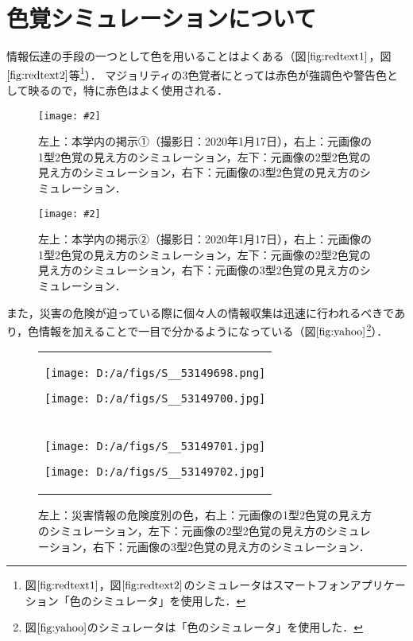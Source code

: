 \documentclass[uplatex,paper=a4,fontsize=4.0truemm,jafontsize=4.0truemm,head_space=30.0truemm,foot_space=30.0truemm,baselineskip=8.0truemm,line_length=40zw,gutter=25.0truemm,oneside,openany,fleqn,hanging_panctuation,open_bracket_pos=nibu_tentsuki,dvipdfmx,jis2004,book,titlepage]{jlreq}
\theoremstyle{mystyle}
\newcommand{\captiondot}[1]{\caption{#1．}}
\newcommand{\figureinput}[4]{\begin{figure}[tbp]\centering\texttt{[image: \#2]}\captiondot{#3}\label{fig:#4}\end{figure}}
\newcommand{\mathdisplaystyle}[1]{\(\displaystyle{#1}\)}
\newcommand{\Reference}[1]{\mathdisplaystyle{\ref{#1}}}
\begin{document}
		\section{色覚シミュレーションについて}
			情報伝達の手段の一つとして色を用いることはよくある（図\Reference{fig:redtext1}，図\Reference{fig:redtext2}等\footnote{図\Reference{fig:redtext1}，図\Reference{fig:redtext2}のシミュレータはスマートフォンアプリケーション「色のシミュレータ」を使用した．}）．
			マジョリティの3色覚者にとっては赤色が強調色や警告色として映るので，特に赤色はよく使用される．
			\figureinput{width=7.5truecm}{D:/a/figs/S__50315266.jpg}{左上：本学内の掲示①（撮影日：2020年1月17日），右上：元画像の1型2色覚の見え方のシミュレーション，左下：元画像の2型2色覚の見え方のシミュレーション，右下：元画像の3型2色覚の見え方のシミュレーション}{redtext1}
			\figureinput{width=7.5truecm}{D:/a/figs/S__50315270.jpg}{左上：本学内の掲示②（撮影日：2020年1月17日），右上：元画像の1型2色覚の見え方のシミュレーション，左下：元画像の2型2色覚の見え方のシミュレーション，右下：元画像の3型2色覚の見え方のシミュレーション}{redtext2}
			また，災害の危険が迫っている際に個々人の情報収集は迅速に行われるべきであり，色情報を加えることで一目で分かるようになっている（図\Reference{fig:yahoo}\footnote{図\protect\Reference{fig:yahoo}のシミュレータは「色のシミュレータ」を使用した．}\cite{Yahoo2020}）．
			\begin{figure}[tbp]
				\centering
				\begin{tabular}{c}
					\begin{minipage}{0.5\linewidth}
						\centering
						\texttt{[image: D:/a/figs/S\_\_53149698.png]}
					\end{minipage}
					\begin{minipage}{0.5\linewidth}
						\centering
						\texttt{[image: D:/a/figs/S\_\_53149700.jpg]}
					\end{minipage} \\
					\begin{minipage}{0.06\linewidth}
						\vspace{10truemm}
					\end{minipage} \\
					\begin{minipage}{0.5\linewidth}
						\centering
						\texttt{[image: D:/a/figs/S\_\_53149701.jpg]}
					\end{minipage}
					\begin{minipage}{0.5\linewidth}
						\centering
						\texttt{[image: D:/a/figs/S\_\_53149702.jpg]}
					\end{minipage}
				\end{tabular}
				\captiondot{左上：災害情報の危険度別の色，右上：元画像の1型2色覚の見え方のシミュレーション，左下：元画像の2型2色覚の見え方のシミュレーション，右下：元画像の3型2色覚の見え方のシミュレーション}\label{fig:yahoo}
			\end{figure}
\end{document}

